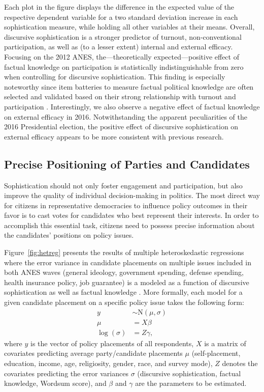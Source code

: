 \documentclass[12pt]{article}
\begin{document}
Each plot in the figure displays the difference in the expected value of the respective dependent variable for a two standard deviation increase in each sophistication measure, while holding all other variables at their means. Overall, discursive sophistication is a stronger predictor of turnout, non-conventional participation, as well as (to a lesser extent) internal and external efficacy. Focusing on the 2012 ANES, the---theoretically expected---positive effect of factual knowledge on participation is statistically indistinguishable from zero when controlling for discursive sophistication. This finding is especially noteworthy since item batteries to measure factual political knowledge are often selected and validated based on their strong relationship with turnout and participation \citep[c.f.,][]{lupia2015uninformed}. Interestingly, we also observe a negative effect of factual knowledge on external efficacy in 2016. Notwithstanding the apparent peculiarities of the 2016 Presidential election, the positive effect of discursive sophistication on external efficacy appears to be more consistent with previous research.


\subsection*{Precise Positioning of Parties and Candidates}

Sophistication should not only foster engagement and participation, but also improve the quality of individual decision-making in politics. The most direct way for citizens in representative democracies to influence policy outcomes in their favor is to cast votes for candidates who best represent their interests. In order to accomplish this essential task, citizens need to possess precise information about the candidates' positions on policy issues.

Figure~\ref{fig:hetreg} presents the results of multiple heteroskedastic regressions where the error variance in candidate placements on multiple issues included in both ANES waves (general ideology, government spending, defense spending, health insurance policy, job guarantee) is a modeled as a function of discursive sophistication as well as factual knowledge \citep[see][for a similar procedure]{jacoby2006value}. More formally, each model for a given candidate placement on a specific policy issue takes the following form:
\begin{align}
y &\sim \text{N}(\mu, \sigma) \\
\mu &= X\beta \\
\log(\sigma) &= Z\gamma,
\end{align}
where $y$ is the vector of policy placements of all respondents, $X$ is a matrix of covariates predicting average party/candidate placements $\mu$ (self-placement, education, income, age, religiosity, gender, race, and survey mode), $Z$ denotes the covariates predicting the error variances $\sigma$ (discursive sophistication, factual knowledge, Wordsum score), and $\beta$ and $\gamma$ are the parameters to be estimated.
\end{document}
